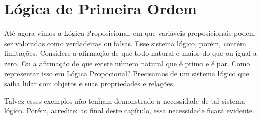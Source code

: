 \newenvironment{bprooftree}
{\leavevmode\hbox\bgroup}
{\DisplayProof\egroup}
  
\chapter{Lógica de Primeira Ordem}
    
    Até agora vimos a Lógica Proposicional, em que variáveis proposicionais podem ser valoradas como verdadeiras ou falsas. Esse sistema lógico, porém, contém limitações. Considere a afirmação de que todo natural é maior do que ou igual a zero.
    Ou a afirmação de que existe número natural que é primo e é par. Como representar isso em Lógica Propocional? Precisamos de um sistema lógico que saiba lidar com objetos e suas propriedades e relações.

    Talvez esses exemplos não tenham demonstrado a necessidade de tal sistema lógico. Porém, acredite: ao final deste capítulo, essa necessidade ficará evidente.

    
    
    